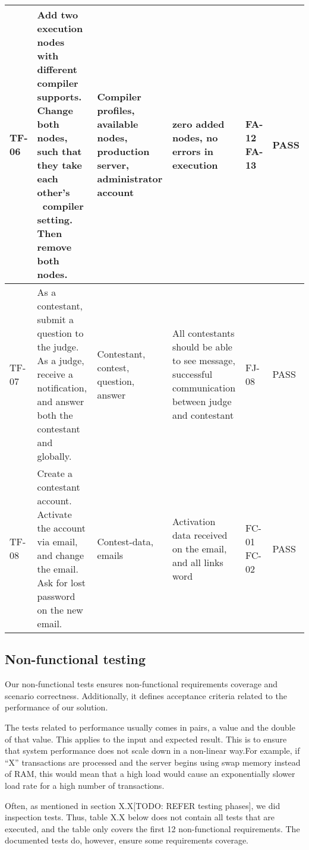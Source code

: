 \begin{longtable}{|l|p{3cm}|p{3cm}|p{3cm}|p{1.1cm}|l|}
TF-06 & Add two execution nodes with different compiler supports. Change both
nodes, such that they take each other's \ compiler setting. Then remove both
nodes. &
Compiler profiles, available nodes, production server, administrator account &
zero added nodes, no errors in execution & FA-12 FA-13 & PASS\\
\hline 

TF-07 & As a contestant, submit a question to the judge. As a judge, receive a
notification, and answer both the contestant and globally. &
Contestant, contest, question, answer &
All contestants should be able to see message, successful communication between
judge and contestant & FJ-08 & PASS\\
\hline

TF-08 & Create a contestant account. Activate the account via email, and change
the email. Ask for lost password on the new  email. &
Contest-data, emails & Activation data received on the email, and all links
word & FC-01 FC-02 & PASS\\
\hline
\end{longtable}


\subsection{Non-functional testing}
Our non-functional tests ensures non-functional requirements coverage
and scenario correctness. Additionally, it defines acceptance criteria
related to the performance of our solution.

The tests related to performance usually comes in pairs, a value and the
double of that value. This applies to the input and expected result.
This is to ensure that system performance does not scale down in a
non-linear way.For example, if ``X''
transactions are processed and the server begins using swap memory
instead of RAM, this would mean that a high load would cause an
exponentially slower load rate for a high number of transactions.

Often, as mentioned in section X.X[TODO: REFER testing phases], we did
inspection tests. Thus, table X.X below does not contain all tests that
are executed, and the table only covers the first 12 non-functional
requirements. The documented tests do, however, ensure some
requirements coverage.

